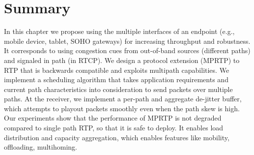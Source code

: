 


\section{Summary}

In this chapter we propose using the multiple interfaces of an endpoint (e.g.,
mobile device, tablet, SOHO gateways) for increasing throughput and
robustness. It corresponds to using congestion cues from out-of-band  sources
(different paths) and signaled in path (in RTCP). We design a protocol
extension (MPRTP) to RTP that is backwards compatible and exploits multipath
capabilities. We implement a scheduling algorithm that takes application
requirements and current path characteristics into consideration to send
packets over multiple paths. At the receiver, we implement a per-path and
aggregate de-jitter buffer, which attempts to playout packets smoothly even
when the path skew is high. Our experiments show that the performance of MPRTP
is not degraded compared to single path RTP, so that it is safe to deploy. It
enables load distribution and capacity aggregation, which enables features
like mobility, offloading, multihoming.
